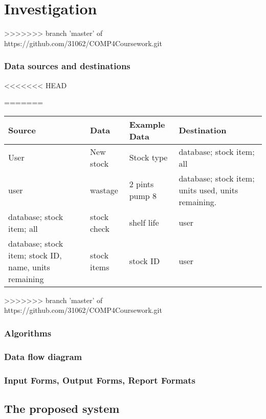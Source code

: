 \section{Investigation}

>>>>>>> branch 'master' of https://github.com/31062/COMP4Coursework.git

\subsubsection{Data sources and destinations}
<<<<<<< HEAD

=======
\begin{center}
\begin{tabular}{|l|l|l|l|}
    \hline
    \textbf{Source} & \textbf{Data} & \textbf{Example Data} & \textbf{Destination} \\ \hline
	User & New stock & Stock type & database; stock item; all \\ \hline
	user & wastage & 2 pints pump 8 &database; stock item; units used, units remaining. \\ \hline
	database; stock item; all & stock check & shelf life & user \\ \hline
	database; stock item; stock ID, name, units remaining & stock items & stock ID & user \\ \hline
	
	
    
\end{tabular}
\label{tab:range_examples}
\end{center}
>>>>>>> branch 'master' of https://github.com/31062/COMP4Coursework.git

\subsubsection{Algorithms}

\subsubsection{Data flow diagram}

\subsubsection{Input Forms, Output Forms, Report Formats}

\subsection{The proposed system}

